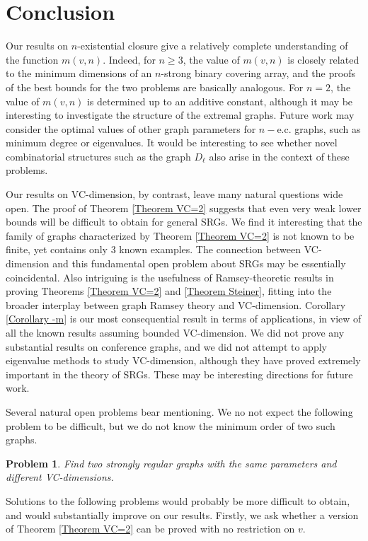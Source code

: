 \documentclass{article}
\newtheorem{prob}[thm]{Problem}
\theoremstyle{definition}
\begin{document}
\section{Conclusion}

Our results on $n$-existential closure give a relatively complete understanding of the function $m(v,n)$. Indeed, for $n\ge 3$, the value of $m(v,n)$ is closely related to the minimum dimensions of an $n$-strong binary covering array, and the proofs of the best bounds for the two problems are basically analogous. For $n=2$, the value of $m(v,n)$ is determined up to an additive constant, although it may be interesting to investigate the structure of the extremal graphs. Future work may consider the optimal values of other graph parameters for $n-$e.c. graphs, such as minimum degree or eigenvalues. It would be interesting to see whether novel combinatorial structures such as the graph $D_\ell$ also arise in the context of these problems.

Our results on VC-dimension, by contrast, leave many natural questions wide open. The proof of Theorem \ref{Theorem VC=2} suggests that even very weak lower bounds will be difficult to obtain for general SRGs. We find it interesting that the family of graphs characterized by Theorem \ref{Theorem VC=2} is not known to be finite, yet contains only 3 known examples. The connection between VC-dimension and this fundamental open problem about SRGs may be essentially coincidental. Also intriguing is the usefulness of Ramsey-theoretic results in proving Theorems \ref{Theorem VC=2} and \ref{Theorem Steiner}, fitting into the broader interplay between graph Ramsey theory and VC-dimension. Corollary \ref{Corollary -m} is our most consequential result in terms of applications, in view of all the known results assuming bounded VC-dimension. We did not prove any substantial results on conference graphs, and we did not attempt to apply eigenvalue methods to study VC-dimension, although they have proved extremely important in the theory of SRGs. These may be interesting directions for future work.

Several natural open problems bear mentioning. We no not expect the following problem to be difficult, but we do not know the minimum order of two such graphs.

\begin{prob}
    Find two strongly regular graphs with the same parameters and different VC-dimensions.
\end{prob}

Solutions to the following problems would probably be more difficult to obtain, and would substantially improve on our results. Firstly, we ask whether a version of Theorem \ref{Theorem VC=2} can be proved with no restriction on $v$.
\end{document}

